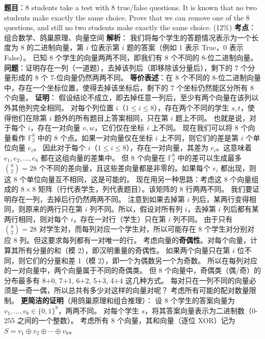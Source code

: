 \documentclass[10pt,a4paper,openany]{ctexbook}
\theoremstyle{definition}
\theoremstyle{remark}
\begin{document}
\textbf{题目}：8 students take a test with 8 true/false questions. It is known that no two students make exactly the same choice. Prove that we can remove one of the 8 questions, and still no two students make exactly the same choice. (12\%)
\textbf{考点}：组合数学、鸽巢原理、向量空间
\textbf{解析}：
我们将每个学生的答题情况表示为一个长度为 8 的二进制向量，第 $i$ 位表示第 $i$ 题的答案（例如 1 表示 True，0 表示 False）。
已知 8 个学生的向量两两不同，即我们有 8 个不同的 8-位二进制向量。
\textbf{问题}：证明存在一列（一道题），去掉该列后（即移除该分量后），剩下的 7 个分量形成的 8 个 7-位向量仍然两两不同。
\textbf{等价表述}：在 8 个不同的 8-位二进制向量中，存在一个坐标位置，使得去掉该坐标后，剩下的 7 个坐标仍然能区分所有 8 个向量。
\textbf{证明}：
假设结论不成立，即去掉任意一列后，至少有两个向量在该列以外其他列完全相同。
对每个列位置 $i$（$1 \leq i \leq 8$），存在两个不同的学生 $s, t$，使得他们在除第 $i$ 题外的所有题目上答案相同，只在第 $i$ 题上不同。
也就是说，对于每个 $i$，存在一对向量 $v, w$，它们仅在坐标 $i$ 上不同。
现在我们可以将 8 个向量看作 $\mathbb{F}_2^8$ 中的 8 个点。如果一对向量仅在坐标 $i$ 上不同，则它们的差是第 $i$ 个单位向量 $e_i$。
因此对于每个 $i$（$1 \leq i \leq 8$），存在一对向量，其差为 $e_i$。这意味着 $e_1, e_2, ..., e_8$ 都在这组向量的差集中。
但 8 个向量在 $\mathbb{F}_2^8$ 中的差可以生成最多 $\binom{8}{2} = 28$ 个不同的差向量，且这些差向量都是非零的。如果每个 $e_i$ 都出现，则这 8 个单位向量互不相同，这是可能的。
现在用另一种思路：考虑这 8 个向量组成的 $8 \times 8$ 矩阵（行代表学生，列代表题目）。该矩阵的 8 行两两不同。
我们要证明存在一列，去掉后行仍然两两不同。
注意到如果去掉第 $i$ 列后，某两行变得相同，则原来的两行只在第 $i$ 列不同。所以，假设对所有列 $i$，去掉第 $i$ 列后都有某两行相同，则对每个 $i$，存在一对行（学生）只在第 $i$ 列不同。
由于只有 $\binom{8}{2} = 28$ 对学生对，而每列对应一个学生对，所以可能存在 8 个学生对分别对应 8 列。但这要求每列都有一对唯一的行。
考虑向量的\textbf{奇偶性}。对每个向量，计算其所有分量的和（模 2），即汉明重量的奇偶性。
如果两个向量只在第 $i$ 位不同，则它们的分量和差 1（模 2），即一个为偶数另一个为奇数。
所以在每列对应的一对向量中，两个向量属于不同的奇偶类。
但 8 个向量中，奇偶类（偶/奇）的分布最多有 8+0, 7+1, 6+2, 5+3, 4+4 这几种方式。
每对只在一列不同的向量必须是一奇一偶，所以总共有多少对这样的向量对呢？
考虑所有可能的配对数量限制。
\textbf{更简洁的证明}（用鸽巢原理和组合推理）：
设 8 个学生的答案向量为 $v_1, ..., v_8 \in \{0,1\}^8$，两两不同。
对每个学生 $s$，将其答案向量表示为二进制数（0-255 之间的一个整数）。
考虑所有 8 个向量，其和向量（逐位 XOR）记为 $S = v_1 \oplus v_2 \oplus \cdots \oplus v_8$。
\end{document}
